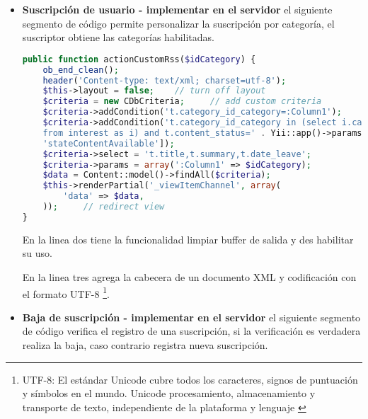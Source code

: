 \begin{itemize}

\item \textbf{Suscripción de usuario - implementar en el servidor} el
siguiente segmento de código permite personalizar la suscripción por
categoría, el suscriptor obtiene las categorías habilitadas. 

\begin{lstlisting}[language=PHP, caption={Personalización de suscriptor.}]
public function actionCustomRss($idCategory) {
    ob_end_clean();
    header('Content-type: text/xml; charset=utf-8');
    $this->layout = false;    // turn off layout
    $criteria = new CDbCriteria;     // add custom criteria
    $criteria->addCondition('t.category_id_category=:Column1');
    $criteria->addCondition('t.category_id_category in (select i.category_id_category
    from interest as i) and t.content_status=' . Yii::app()->params[
    'stateContentAvailable']);
    $criteria->select = 't.title,t.summary,t.date_leave';
    $criteria->params = array(':Column1' => $idCategory);
    $data = Content::model()->findAll($criteria);
    $this->renderPartial('_viewItemChannel', array(
        'data' => $data,
    ));     // redirect view
}
\end{lstlisting}

En la linea dos tiene la funcionalidad limpiar buffer de salida y
des habilitar su uso.

En la linea tres agrega la cabecera de un documento XML y codificación con
el formato UTF-8 \footnote{UTF-8: El estándar Unicode cubre todos
los caracteres, signos de puntuación y símbolos en el mundo. Unicode 
procesamiento, almacenamiento y transporte de texto, independiente de la 
plataforma y lenguaje \cite{utf8}}.

\item \textbf{Baja de suscripción - implementar en el servidor} el siguiente
segmento de código verifica el registro de una suscripción, si la verificación
es verdadera realiza la baja, caso contrario registra nueva suscripción.


\end{itemize}
